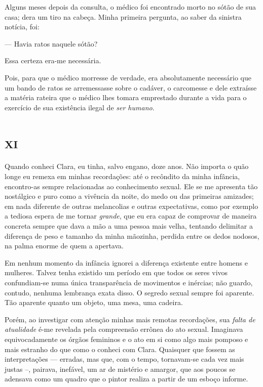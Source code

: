 Alguns meses depois da consulta, o médico foi encontrado morto no sótão de sua casa; dera um tiro na cabeça.
Minha primeira pergunta, ao saber da sinistra notícia, foi:

--- Havia ratos naquele sótão?

Essa certeza era-me necessária.

Pois, para que o médico morresse de verdade, era absolutamente necessário que um bando de ratos se arremessasse sobre o cadáver, o carcomesse e dele extraísse a matéria rateira que o médico lhes tomara emprestado durante a vida para o exercício de sua existência ilegal de \textit{ser humano}.


\chapter*{\huge\centering\textsc{xi}}

Quando conheci Clara, eu tinha, salvo engano, doze anos. Não importa o quão longe eu remexa em minhas recordações: até o recôndito da minha infância, encontro-as sempre relacionadas ao conhecimento sexual. Ele se me apresenta tão nostálgico e puro como a vivência da noite, do medo ou das primeiras amizades; em nada diferente de outras melancolias e outras expectativas, como por exemplo a tediosa espera de me tornar \textit{grande}, que eu era capaz de comprovar de maneira concreta sempre que dava a mão a uma pessoa mais velha, tentando delimitar a diferença de peso e tamanho da minha mãozinha, perdida entre os dedos nodosos, na palma enorme de quem a apertava.

Em nenhum momento da infância ignorei a diferença existente entre homens e mulheres. Talvez tenha existido um período em que todos os seres vivos confundiam-se numa única transparência de movimentos e inércias; não guardo, contudo, nenhuma lembrança exata disso. O segredo sexual sempre foi aparente. Tão aparente quanto um objeto, uma mesa, uma cadeira.

Porém, ao investigar com atenção minhas mais remotas recordações, sua \textit{falta de atualidade} é-me revelada pela compreensão errônea do ato sexual. Imaginava equivocadamente os órgãos femininos e o ato em si como algo mais pomposo e mais estranho do que como o conheci com Clara. Quaisquer que fossem as interpretações --- erradas, mas que, com o tempo, tornavam-se cada vez mais justas --, pairava, inefável, um ar de mistério e amargor, que aos poucos se adensava como um quadro que o pintor realiza a partir de um esboço informe.


